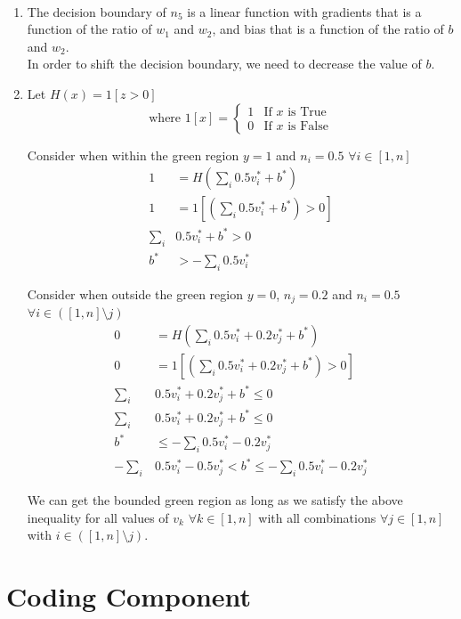 \documentclass[12pt]{article}
\newenvironment{solution}[2][Solution]{\begin{trivlist}
\item[\hskip \labelsep {\bfseries #1}]}{\end{trivlist}}
\begin{document}
\begin{solution}{}~
\begin{enumerate}
\item The decision boundary of $n_5$ is a linear function with gradients that is a function of the ratio of $w_1$ and $w_2$, and bias that is a function of the ratio of $b$ and $w_2$.\\
In order to shift the decision boundary, we need to decrease the value of $b$.
\item Let $H(x)=1[z>0]$\\
$$
\text{where }1[x]=\left\{\begin{array}{ll}
1 & \text{If }x\text{ is True}\\
0 & \text{If }x\text{ is False}
\end{array}\right.
$$

Consider when within the green region $y=1$ and $n_i=0.5$ $\forall i\in[1,n]$
\begin{align*}
1&=H(\sum_i0.5v_i^*+b^*)\\
1&=1[(\sum_i0.5v_i^*+b^*)>0]\\
\sum_i&0.5v_i^*+b^*>0\\
b^*&>-\sum_i0.5v_i^*
\end{align*}

Consider when outside the green region $y=0$, $n_j=0.2$ and $n_i=0.5$ $\forall i\in([1,n]\setminus j)$
\begin{align*}
0&=H(\sum_{i}0.5v_i^*+0.2v_j^*+b^*)\\
0&=1[(\sum_i0.5v_i^*+0.2v_j^*+b^*)>0]\\
\sum_i&0.5v_i^*+0.2v_j^*+b^*\leq0\\
\sum_i&0.5v_i^*+0.2v_j^*+b^*\leq0\\
b^*&\leq-\sum_i0.5v_i^*-0.2v_j^*\\
-\sum_i&0.5v_i^*-0.5v_j^*<b^*\leq-\sum_i0.5v_i^*-0.2v_j^*
\end{align*}

We can get the bounded green region as long as we satisfy the above inequality for all values of $v_k$ $\forall k\in[1,n]$ with all combinations $\forall j\in[1,n]$ with $i\in([1,n]\setminus j)$.
\end{enumerate}
\end{solution}

\pagebreak

\section{Coding Component}


\end{document}
